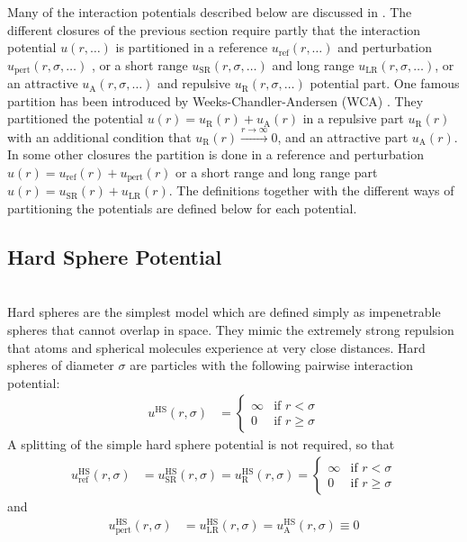 Many of the interaction potentials described below are discussed in \cite{Likos2001}.
The different closures of the previous section require partly that the interaction potential $u(r,\ldots)$
is partitioned in a reference $u_\text{ref}(r,\ldots)$ and perturbation $u_\text{pert}(r,\sigma,\ldots)$ ,
or a short range $u_\text{SR}(r,\sigma,\ldots)$
and long range $u_\text{LR}(r,\sigma,\ldots)$, or an attractive $u_\text{A}(r,\sigma,\ldots)$ and
repulsive $u_\text{R}(r,\sigma,\ldots)$ potential part.
One famous partition has been introduced by Weeks-Chandler-Andersen (WCA) \cite{Weeks1971}.
They partitioned the potential $u(r)=u_\text{R}(r)+u_\text{A}(r)$ in a repulsive part $u_\text{R}(r)$
with an additional condition that $u_\text{R}(r)  \xrightarrow{r\rightarrow\infty}0 $,
and an attractive part $u_\text{A}(r)$.
In some other closures the partition is done in a reference and perturbation $u(r)=u_\text{ref}(r)+u_\text{pert}(r)$
or a short range and long range part $u(r)=u_\text{SR}(r)+u_\text{LR}(r)$.
The definitions together with the different ways of partitioning the potentials are defined below for
each potential.

\newpage
\subsection{Hard Sphere Potential}
~\\

Hard spheres are the simplest model which are defined simply as impenetrable spheres that cannot overlap
in space. They mimic the extremely strong repulsion that atoms and spherical molecules
experience at very close distances.
Hard spheres of diameter $\sigma$ are particles with the following pairwise interaction potential:
\begin{align}
u^\text{HS}(r,\sigma) &=
\begin{cases}
\infty  & \mbox{if } r <    \sigma \\
0       & \mbox{if } r \geq \sigma
\end{cases}
\end{align}
A splitting of the simple hard sphere potential is not required, so that
\begin{align}
u^\text{HS}_\text{ref}(r,\sigma) &= u^\text{HS}_\text{SR}(r,\sigma) = u^\text{HS}_\text{R}(r,\sigma) =
\begin{cases}
\infty  & \mbox{if } r <    \sigma \\
0       & \mbox{if } r \geq \sigma
\end{cases}
\end{align}
and
\begin{align}
u^\text{HS}_\text{pert}(r,\sigma) &= u^\text{HS}_\text{LR}(r,\sigma) = u^\text{HS}_\text{A}(r,\sigma) \equiv 0
\end{align}

